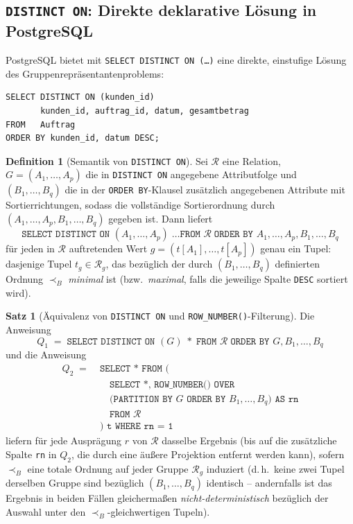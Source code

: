 ﻿\documentclass[a4paper,12pt]{report}
\theoremstyle{definition}
\newtheorem{definition}{Definition}[chapter]
\newtheorem{theorem}{Satz}[chapter]
\theoremstyle{remark}
\newcommand{\R}{\mathcal{R}}
\begin{document}
\subsection{\texttt{DISTINCT ON}: Direkte deklarative Lösung in PostgreSQL}
\label{sec:distinct-on-postgres}

PostgreSQL bietet mit \texttt{SELECT DISTINCT ON (\ldots)} eine
direkte, einstufige Lösung des Gruppenrepräsentantenproblems:

\begin{lstlisting}
SELECT DISTINCT ON (kunden_id)
       kunden_id, auftrag_id, datum, gesamtbetrag
FROM   Auftrag
ORDER BY kunden_id, datum DESC;
\end{lstlisting}

\begin{definition}[Semantik von \texttt{DISTINCT ON}]
\label{def:distinct-on}
Sei $\R$ eine Relation, $G=(A_1,\ldots,A_p)$ die in
\texttt{DISTINCT ON} angegebene Attributfolge und
$(B_1,\ldots,B_q)$ die in der \texttt{ORDER BY}-Klausel zusätzlich
angegebenen Attribute mit Sortierrichtungen, sodass die vollständige
Sortierordnung durch $(A_1,\ldots,A_p,B_1,\ldots,B_q)$ gegeben ist.
Dann liefert
\[
  \texttt{SELECT DISTINCT ON } (A_1,\ldots,A_p)\;
  \texttt{\ldots FROM } \R \;
  \texttt{ORDER BY } A_1,\ldots,A_p,B_1,\ldots,B_q
\]
für jeden in $\R$ auftretenden Wert $g=(t[A_1],\ldots,t[A_p])$ genau
ein Tupel: dasjenige Tupel $t_g\in\R_g$, das bezüglich der durch
$(B_1,\ldots,B_q)$ definierten Ordnung $\prec_B$ \emph{minimal} ist
(bzw.\ \emph{maximal}, falls die jeweilige Spalte \texttt{DESC}
sortiert wird).
\end{definition}

\begin{theorem}[Äquivalenz von \texttt{DISTINCT ON} und
\texttt{ROW\_NUMBER()}-Filterung]
\label{thm:distinct-on-aequivalenz}
Die Anweisung
\[
  Q_1 \;=\; \texttt{SELECT DISTINCT ON } (G)\; * \;
  \texttt{FROM } \R \;\texttt{ORDER BY } G, B_1,\ldots,B_q
\]
und die Anweisung
\begin{align*}
  Q_2 \;=\; & \texttt{SELECT * FROM (}\\
  & \quad\texttt{SELECT *, ROW\_NUMBER() OVER}\\
  & \quad\texttt{(PARTITION BY } G \texttt{ ORDER BY }
    B_1,\ldots,B_q\texttt{) AS rn}\\
  & \quad\texttt{FROM } \R\\
  & \texttt{) t WHERE rn = 1}
\end{align*}
liefern für jede Ausprägung $r$ von $\R$ dasselbe Ergebnis (bis auf
die zusätzliche Spalte \texttt{rn} in $Q_2$, die durch eine äußere
Projektion entfernt werden kann), sofern $\prec_B$ eine totale Ordnung
auf jeder Gruppe $\R_g$ induziert (d.\,h.\ keine zwei Tupel derselben
Gruppe sind bezüglich $(B_1,\ldots,B_q)$ identisch -- andernfalls ist
das Ergebnis in beiden Fällen gleichermaßen \emph{nicht-deterministisch}
bezüglich der Auswahl unter den $\prec_B$-gleichwertigen Tupeln).
\end{theorem}
\end{document}
